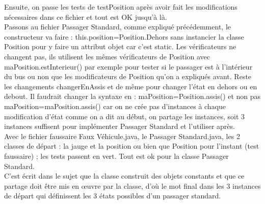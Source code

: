 \documentclass{article}
\begin{document}
Ensuite, on passe les tests de testPosition après avoir fait les modifications nécessaires dans ce fichier et tout est OK jusqu’à là.\\
Passons au fichier Passager Standard, comme expliqué précédemment, le constructeur va
faire : this.position=Position.Dehors sans instancier la classe Position pour y faire un attribut objet car c’est static. Les vérificateurs ne changent pas, ils utilisent les mêmes vérificateurs de Position avec maPosition.estInterieur() par exemple pour tester si le passager est à l'intérieur du bus ou non que les modificateurs de Position qu’on a expliqués avant. Reste les changements changerEnAssis et de même pour changer l’état en dehors ou en debout. Il faudrait changer la syntaxe en : maPosition=Position.assis() et non pas maPosition=maPosition.assis() car on ne crée pas d’instances à chaque modification d’état comme on a dit au début, on partage les instances, soit 3 instances suffisent pour implémenter Passager Standard et l’utiliser après.\\


Avec le fichier faussaire Faux Véhicule.java, le Passager Standard.java, les 2 classes de
départ : la jauge et la position ou bien que Position pour l’instant (test faussaire) ; les tests passent en vert. Tout est ok pour la classe Passager Standard.\\

C’est écrit dans le sujet que la classe construit des objets constants et que ce partage
doit être mis en œuvre par la classe, d’où le mot final dans les 3 instances de départ qui définissent les 3 états possibles d’un passager standard.\\
\end{document}
